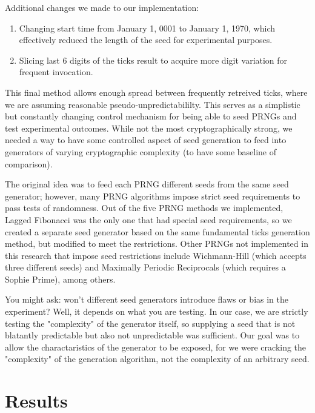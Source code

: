 \documentclass[conference]{IEEEtran}
\begin{document}
Additional changes we made to our implementation:
\begin{enumerate}
    \item Changing start time from January 1, 0001 to January 1, 1970, which effectively reduced the length of the seed for experimental purposes.
    \item Slicing last 6 digits of the ticks result to acquire more digit variation for frequent invocation.
\end{enumerate}
This final method allows enough spread between frequently retreived ticks, where we are assuming reasonable pseudo-unpredictabililty. This serves as a simplistic but constantly changing control mechanism for being able to seed PRNGs and test experimental outcomes. While not the most cryptographically strong, we needed a way to have some controlled aspect of seed generation to feed into generators of varying cryptographic complexity (to have some baseline of comparison).\newline

The original idea was to feed each PRNG different seeds from the same seed generator; however, many PRNG algorithms impose strict seed requirements to pass tests of randomness. Out of the five PRNG methods we implemented, Lagged Fibonacci was the only one that had special seed requirements, so we created a separate seed generator based on the same fundamental ticks generation method, but modified to meet the restrictions. Other PRNGs not implemented in this research that impose seed restrictions include Wichmann-Hill (which accepts three different seeds) and Maximally Periodic Reciprocals (which requires a Sophie Prime), among others.\newline

You might ask: won't different seed generators introduce flaws or bias in the experiment? Well, it depends on what you are testing. In our case, we are strictly testing the "complexity" of the generator itself, so supplying a seed that is not blatantly predictable but also not unpredictable was sufficient. Our goal was to allow the charactaristics of the generator to be exposed, for we were cracking the "complexity" of the generation algorithm, not the complexity of an arbitrary seed.


\section{Results}
\end{document}
